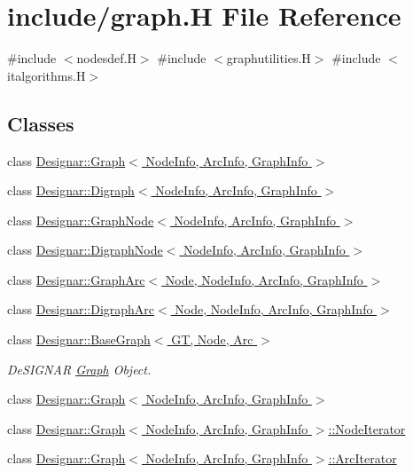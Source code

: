 \hypertarget{graph_8_h}{}\section{include/graph.H File Reference}
\label{graph_8_h}
{\ttfamily \#include $<$nodesdef.\+H$>$}\newline
{\ttfamily \#include $<$graphutilities.\+H$>$}\newline
{\ttfamily \#include $<$italgorithms.\+H$>$}\newline
\subsection*{Classes}
\begin{DoxyCompactItemize}
\item 
class \hyperlink{class_designar_1_1_graph}{Designar\+::\+Graph$<$ Node\+Info, Arc\+Info, Graph\+Info $>$}
\item 
class \hyperlink{class_designar_1_1_digraph}{Designar\+::\+Digraph$<$ Node\+Info, Arc\+Info, Graph\+Info $>$}
\item 
class \hyperlink{class_designar_1_1_graph_node}{Designar\+::\+Graph\+Node$<$ Node\+Info, Arc\+Info, Graph\+Info $>$}
\item 
class \hyperlink{class_designar_1_1_digraph_node}{Designar\+::\+Digraph\+Node$<$ Node\+Info, Arc\+Info, Graph\+Info $>$}
\item 
class \hyperlink{class_designar_1_1_graph_arc}{Designar\+::\+Graph\+Arc$<$ Node, Node\+Info, Arc\+Info, Graph\+Info $>$}
\item 
class \hyperlink{class_designar_1_1_digraph_arc}{Designar\+::\+Digraph\+Arc$<$ Node, Node\+Info, Arc\+Info, Graph\+Info $>$}
\item 
class \hyperlink{class_designar_1_1_base_graph}{Designar\+::\+Base\+Graph$<$ G\+T, Node, Arc $>$}
\begin{DoxyCompactList}\small\item\em De\+S\+I\+G\+N\+AR \hyperlink{class_designar_1_1_graph}{Graph} Object. \end{DoxyCompactList}\item 
class \hyperlink{class_designar_1_1_graph}{Designar\+::\+Graph$<$ Node\+Info, Arc\+Info, Graph\+Info $>$}
\item 
class \hyperlink{class_designar_1_1_graph_1_1_node_iterator}{Designar\+::\+Graph$<$ Node\+Info, Arc\+Info, Graph\+Info $>$\+::\+Node\+Iterator}
\item 
class \hyperlink{class_designar_1_1_graph_1_1_arc_iterator}{Designar\+::\+Graph$<$ Node\+Info, Arc\+Info, Graph\+Info $>$\+::\+Arc\+Iterator}

\end{DoxyCompactItemize}
